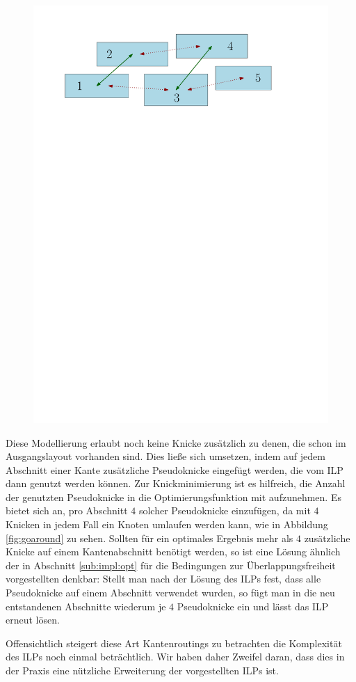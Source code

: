 \begin{figure}
\begin{minipage}{.8\textwidth}
  \includegraphics[width=.8\linewidth]{figures/neighbors.pdf}
  \label{fig:neighbors}
\end{minipage}
\end{figure}

Diese Modellierung erlaubt noch keine Knicke zusätzlich zu denen, die schon im Ausgangslayout vorhanden sind. Dies ließe sich umsetzen, indem auf jedem Abschnitt einer Kante zusätzliche Pseudoknicke eingefügt werden, die vom ILP dann genutzt werden können. Zur Knickminimierung ist es hilfreich, die Anzahl der genutzten Pseudoknicke in die Optimierungsfunktion mit aufzunehmen. Es bietet sich an, pro Abschnitt $4$ solcher Pseudoknicke einzufügen, da mit $4$ Knicken in jedem Fall ein Knoten umlaufen werden kann, wie in Abbildung \ref{fig:goaround} zu sehen. Sollten für ein optimales Ergebnis mehr als $4$ zusätzliche Knicke auf einem Kantenabschnitt benötigt werden, so ist eine Lösung ähnlich der in Abschnitt \ref{sub:impl:opt} für die Bedingungen zur Überlappungsfreiheit vorgestellten denkbar: Stellt man nach der Lösung des ILPs fest, dass alle Pseudoknicke auf einem Abschnitt verwendet wurden, so fügt man in die neu entstandenen Abschnitte wiederum je $4$ Pseudoknicke ein und lässt das ILP erneut lösen.

Offensichtlich steigert diese Art Kantenroutings zu betrachten die Komplexität des ILPs noch einmal beträchtlich. Wir haben daher Zweifel daran, dass dies in der Praxis eine nützliche Erweiterung der vorgestellten ILPs ist.
